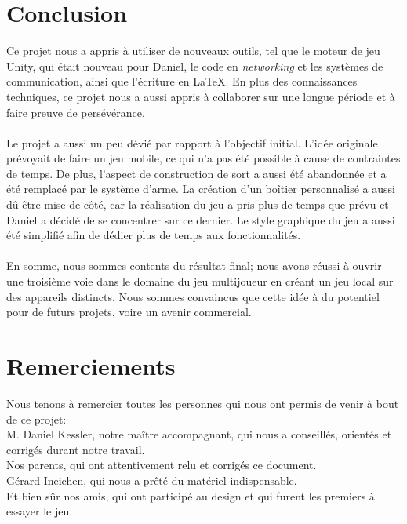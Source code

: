 \documentclass[a4paper]{article}
\begin{document}
\section{Conclusion}
Ce projet nous a appris à utiliser de nouveaux outils, tel que le moteur de jeu Unity, qui était nouveau pour Daniel, le code en \textit{networking} et les systèmes de communication, ainsi que l'écriture en \LaTeX. En plus des connaissances techniques, ce projet nous a aussi appris à collaborer sur une longue période et à faire preuve de persévérance. \\
\\
Le projet a aussi un peu dévié par rapport à l'objectif initial.  L’idée originale prévoyait de faire un
jeu mobile, ce qui n’a pas été possible à cause de contraintes de temps. De plus, l'aspect de construction de sort a aussi été abandonnée et a été remplacé par le système d'arme.  La création d'un boîtier personnalisé a aussi dû être mise de côté, car la réalisation du jeu a pris plus de temps que prévu et Daniel a décidé de se concentrer sur ce dernier. Le style graphique du jeu a aussi été simplifié afin de dédier plus de temps aux fonctionnalités.\\
\\
En somme, nous sommes contents du résultat final; nous avons réussi à ouvrir une troisième voie dans le domaine du jeu multijoueur en créant un jeu local sur des appareils distincts. Nous sommes convaincus que cette idée à du potentiel pour de futurs projets, voire un avenir commercial.

\section{Remerciements}
Nous tenons à remercier toutes les personnes qui nous ont permis de venir à bout de ce projet: \\ 
M. Daniel Kessler, notre maître accompagnant, qui nous a conseillés, orientés et corrigés durant notre travail. \\
Nos parents, qui ont attentivement relu et corrigés ce document.  \\
Gérard Ineichen, qui nous a prêté du matériel indispensable. \\
Et bien sûr nos amis, qui ont participé au design et qui furent les premiers à essayer le jeu.
\end{document}
